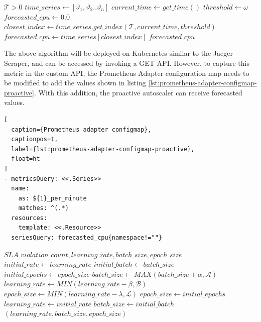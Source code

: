 \begin{algorithm}
    \caption{Get predicted CPU value at time $\mathcal{T}$}
    \label{alg:get-forecast-value}
    \begin{algorithmic}
        \Require $\mathcal{T} > 0$
        \State $time\_series \gets [ \vartheta_1, \vartheta_2 .. \vartheta_n ]$
        \State $current\_time \gets get\_time()$
        \State $threshold \gets \omega$
        \State $forecasted\_cpu \gets 0.0$
        \State $closest\_index \gets time\_series.get\_index(\mathcal{T}, current\_time, threshold)$
            \State $forecasted\_cpu \gets time\_series[closest\_index]$
        \EndIf
        \State \Return $forecasted\_cpu$
    \end{algorithmic}
\end{algorithm}

The above algorithm will be deployed on Kubernetes similar to the Jaeger-Scraper, and can be accessed by invoking a GET API. However, to capture this metric in the custom API, the Prometheus Adapter configuration map needs to be modified to add the values shown in listing \ref{lst:prometheus-adapter-configmap-proactive}. With this addition, the proactive autoscaler can receive forecasted values.\par

\begin{lstlisting}[
  caption={Prometheus adapter configmap},
  captionpos=t,
  label={lst:prometheus-adapter-configmap-proactive},
  float=ht
]
- metricsQuery: <<.Series>>
  name:
    as: ${1}_per_minute
    matches: ^(.*)
  resources:
    template: <<.Resource>>
  seriesQuery: forecasted_cpu{namespace!=""}
\end{lstlisting}

\begin{algorithm}
    \caption{SLA-based feedback loop for proactive forecaster}
    \label{alg:sla-heuristic-feedback}
    \begin{algorithmic}
        \Require $SLA\_violation\_count, learning\_rate, batch\_size, epoch\_size$
        \State $initial\_rate \gets learning\_rate$
        \State $initial\_batch \gets batch\_size$
        \State $initial\_epochs \gets epoch\_size$
            \State $batch\_size \gets MAX(batch\_size + \alpha, \mathcal{A})$
            \State $learning\_rate \gets MIN(learning\_rate - \beta, \mathcal{B})$
            \State $epoch\_size \gets MIN(learning\_rate - \lambda, \mathcal{L})$
        \Else
            \State $epoch\_size \gets initial\_epochs$
            \State $learning\_rate \gets initial\_rate$
            \State $batch\_size \gets initial\_batch$
        \EndIf
        \State \Return $(learning\_rate, batch\_size, epoch\_size)$
    \end{algorithmic}
\end{algorithm}

